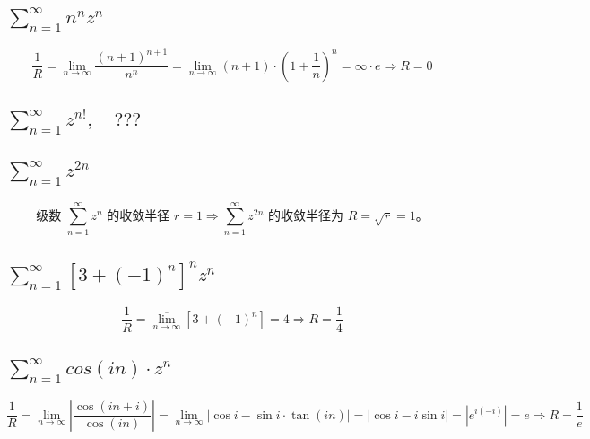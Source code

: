 \documentclass[UTF8]{report}
\theoremstyle{MyLineTheoremStyle} %
\theoremstyle{MyBlockTheoremStyle} %
\theoremstyle{MySubsubsectionStyle} %
\begin{document}
\subsection{$\displaystyle \sum_{n=1}^{\infty} n^n z^n $}
\noindent
\begin{equation}
    \frac{1}{R} = \lim_{n \to \infty} \frac{(n+1)^{n+1}}{n^n} = \lim_{n \to \infty} (n+1)\cdot \left(1 + \frac{1}{n}\right)^n = \infty \cdot e \Longrightarrow R = 0
\end{equation}

\subsection{$\displaystyle \sum_{n=1}^{\infty} z^{n!},\quad 
???
$}

\subsection{$\displaystyle \sum_{n=1}^{\infty} z^{2n}$}
\noindent
\begin{equation}
\text{级数 $\sum_{n=1}^{\infty} z^{n} $ 的收敛半径 $r = 1 \Longrightarrow  \sum_{n=1}^{\infty} z^{2n}$ 的收敛半径为 $R = \sqrt{r} = 1$。}
\end{equation}



\subsection{$\displaystyle \sum_{n=1}^{\infty} \left[3 + (-1)^n\right]^n z^n$}
\noindent
\begin{equation}
\frac{1}{R} = \overline{\lim_{n \to \infty}} \left[3 + (-1)^n\right] = 4 \Longrightarrow R = \frac{1}{4}
\end{equation}


\subsection{$\displaystyle \sum_{n=1}^{\infty} cos(in) \cdot z^n$}
\noindent
\begin{equation}
\frac{1}{R} 
= \lim_{n \to \infty} \left| \frac{\cos (in+i)}{\cos (in)} \right| 
= \lim_{n \to \infty} \left| \cos i - \sin i \cdot \tan (in) \right|
= \left| \cos i - i\sin i \right|
= | e^{i(-i)} | = e \Longrightarrow R = \frac{1}{e}
\end{equation}
\end{document}
